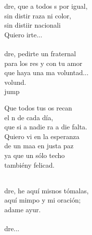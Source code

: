 \begin{cancion}%
	dre, que a todos s por igual,\\
	sin distir raza ni color,\\
	sin distiir nacionali\\
	Quiero irte...\\
	\jump\\
	dre, pedirte un fraternal \\
	para los res y con tu amor\\
	que haya una ma voluntad...\\
	 volund. \\jump\\
	\begin{chorus}%
	Que todos tus os recan\\
	el n de cada día,\\
	que si a nadie ra a die falta. \\
	Quiero vi en la esperanza\\
	de un maa en justa paz\\
	ya que  un sólo techo\\
	tambiény felicad.\\
	\end{chorus}%
	\jump\\
	dre, he aquí misnos tómalas,\\
	aquí mimpo y mi oración;\\
	adame ayur.  \\
	\jump\\
	dre...\\
\end{cancion}%
